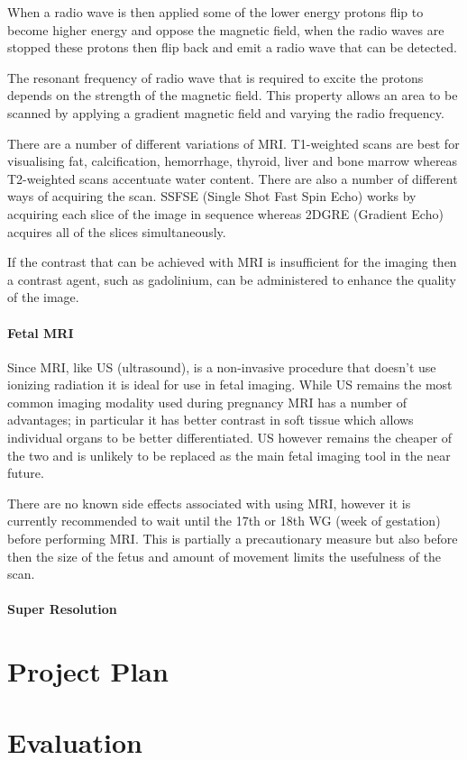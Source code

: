 \documentclass[
  oneside,
  11pt, a4paper,
  footinclude=true,
  headinclude=true,
  cleardoublepage=empty
]{scrbook}
\begin{document}
When a radio wave is then applied some of the lower energy protons flip to become higher energy and oppose the magnetic field, when the radio waves are stopped these protons then flip back and emit a radio wave that can be detected.

The resonant frequency of radio wave that is required to excite the protons depends on the strength of the magnetic field. This property allows an area to be scanned by applying a gradient magnetic field and varying the radio frequency.

There are a number of different variations of MRI. T1-weighted scans are best for visualising fat, calcification, hemorrhage, thyroid, liver and bone marrow whereas T2-weighted scans accentuate water content.
There are also a number of different ways of acquiring the scan. SSFSE (Single Shot Fast Spin Echo) works by acquiring each slice of the image in sequence whereas 2DGRE (Gradient Echo) acquires all of the slices simultaneously.

If the contrast that can be achieved with MRI is insufficient for the imaging then a contrast agent, such as gadolinium, can be administered to enhance the quality of the image.

\subsubsection{Fetal MRI\cite{fetalmri}}

Since MRI, like US (ultrasound), is a non-invasive procedure that doesn’t use ionizing radiation it is ideal for use in fetal imaging. While US remains the most common imaging modality used during pregnancy MRI has a number of advantages; in particular it has better contrast in soft tissue which allows individual organs to be better differentiated. US however remains the cheaper of the two and is unlikely to be replaced as the main fetal imaging tool in the near future.

There are no known side effects associated with using MRI, however it is currently recommended to wait until the 17th or 18th WG (week of gestation) before performing MRI. This is partially a precautionary measure but also before then the size of the fetus and amount of movement limits the usefulness of the scan.

\subsubsection{Super Resolution}


\chapter{Project Plan}

\chapter{Evaluation}

 

    
\end{document}
